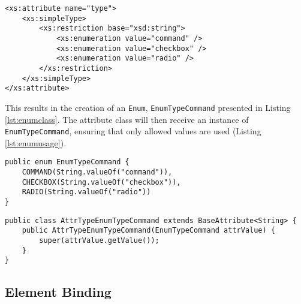 \bigskip


\begin{minipage}{\linewidth}
\begin{lstlisting}[caption={Enumeration XSD Definition},label={lst:enumxsddefinition}]
<xs:attribute name="type">
    <xs:simpleType>
        <xs:restriction base="xsd:string">
            <xs:enumeration value="command" />
            <xs:enumeration value="checkbox" />
            <xs:enumeration value="radio" />
        </xs:restriction>
    </xs:simpleType>
</xs:attribute>
\end{lstlisting}
\end{minipage}

\noindent
This results in the creation of an \texttt{Enum}, \texttt{EnumTypeCommand} presented in Listing \ref{lst:enumclass}. The attribute class will then receive an instance of \texttt{EnumTypeCommand}, ensuring that only allowed values are used (Listing \ref{lst:enumusage}).

\bigskip


\begin{minipage}{\linewidth}
\begin{lstlisting}[caption={Enumeration Class},label={lst:enumclass}]
public enum EnumTypeCommand {
    COMMAND(String.valueOf("command")), 
    CHECKBOX(String.valueOf("checkbox")),
    RADIO(String.valueOf("radio"))
}
\end{lstlisting}
\end{minipage}


\begin{minipage}{\linewidth}
\begin{lstlisting}[caption={Attribute Receiving An Enumeration},label={lst:enumusage}]
public class AttrTypeEnumTypeCommand extends BaseAttribute<String> {
    public AttrTypeEnumTypeCommand(EnumTypeCommand attrValue) {
        super(attrValue.getValue());
    }
}
\end{lstlisting}
\end{minipage}

\subsection{Element Binding}
\label{sec:elementbinding}

